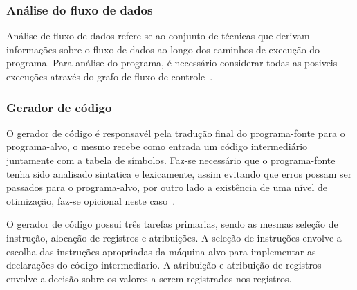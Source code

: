 \subsubsection{Análise do fluxo de dados}
\par
Análise de fluxo de dados refere-se ao conjunto de técnicas que derivam informações sobre o fluxo de dados ao longo dos caminhos de execução do programa. 
Para análise do programa, é necessário considerar todas as posiveis execuções através do grafo de fluxo de controle~\cite{aho2007compilers}.


\subsubsection{Gerador de código}
\par
O gerador de código é responsavél pela tradução final do programa-fonte para o programa-alvo, o mesmo recebe como entrada um código intermediário juntamente com a tabela de símbolos. Faz-se necessário que o programa-fonte tenha sido analisado sintatica e lexicamente, assim evitando que erros possam ser passados para o programa-alvo, por outro lado a existência de uma nível de otimização, faz-se opicional neste caso~\cite{aho2007compilers}.

\par
O gerador de código possui três tarefas primarias, sendo as mesmas seleção de instrução, alocação de registros e atribuições. A seleção de instruções envolve a escolha das instruções apropriadas da máquina-alvo para implementar as declarações do código intermediario. A atribuição e atribuição de registros envolve a decisão sobre os valores a serem registrados nos registros\cite{aho2007compilers}.

